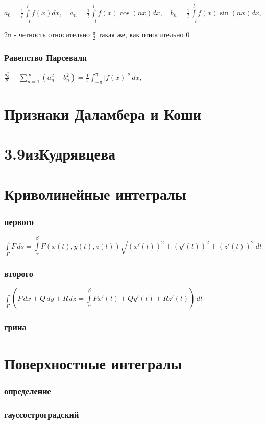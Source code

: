 $a_0= \frac{1}{l}\int\limits_{-l}^{l}f(x)dx, \quad a_n= \frac{1}{l}\int\limits_{-l}^{l}f(x)\cos(nx)dx, \quad b_n= \frac{1}{l}\int\limits_{-l}^{l}f(x)\sin(nx)dx,$

2n - четность относительно $\frac {\pi}{2}$ такая же, как относительно 0

\subsubsection{Равенство Парсеваля} 
$\frac {a_0^2}{2} + \sum _{{n=1}}^{\infty }(a_n^2 +b_n^2)={\frac  {1}{\pi }}\int _{{-\pi }}^{\pi }|f(x)|^{2}\,dx,$

\section{Признаки Даламбера и Коши}

\section{3.9изКудрявцева}

\section{Криволинейные интегралы}
\subsubsection{первого}
$\int\limits_{\Gamma} F\, ds = \int\limits_{\alpha}^{\beta} F(x(t),y(t),z(t))\sqrt{(x'(t))^2+(y'(t))^2+(z'(t))^2}\,dt$
\subsubsection{второго}
$\int\limits_{\Gamma} \left(P\,dx+Q\,dy+R\,dz=\int\limits_{\alpha}^{\beta} P x'(t)+ Q y'(t)+ R z'(t)\right)\,dt$
\subsubsection{грина}


\section{Поверхностные интегралы}
\subsubsection{определение}
\subsubsection{гауссостроградский}

